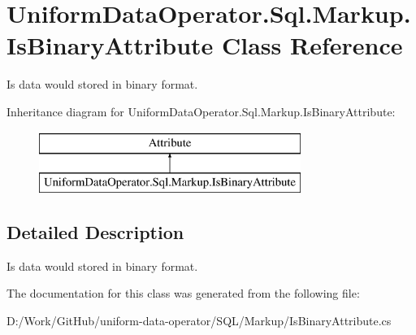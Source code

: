 \hypertarget{class_uniform_data_operator_1_1_sql_1_1_markup_1_1_is_binary_attribute}{}\section{Uniform\+Data\+Operator.\+Sql.\+Markup.\+Is\+Binary\+Attribute Class Reference}
\label{class_uniform_data_operator_1_1_sql_1_1_markup_1_1_is_binary_attribute}


Is data would stored in binary format.  


Inheritance diagram for Uniform\+Data\+Operator.\+Sql.\+Markup.\+Is\+Binary\+Attribute\+:\begin{figure}[H]
\begin{center}
\leavevmode
\includegraphics[height=2.000000cm]{df/dc1/class_uniform_data_operator_1_1_sql_1_1_markup_1_1_is_binary_attribute}
\end{center}
\end{figure}


\subsection{Detailed Description}
Is data would stored in binary format. 



The documentation for this class was generated from the following file\+:\begin{DoxyCompactItemize}
\item 
D\+:/\+Work/\+Git\+Hub/uniform-\/data-\/operator/\+S\+Q\+L/\+Markup/Is\+Binary\+Attribute.\+cs\end{DoxyCompactItemize}
